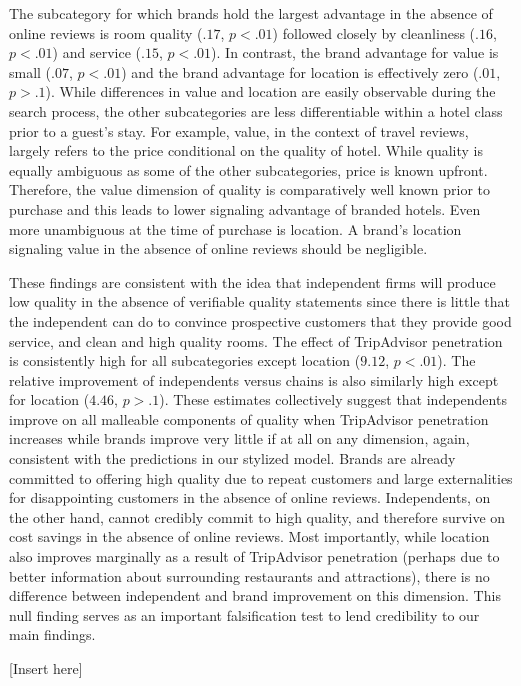 \documentclass[mksc,blindrev]{informs3} %
\begin{document}
The subcategory for which brands hold the largest advantage in the absence of online reviews is room quality ($.17$, $p<.01$) followed closely by cleanliness ($.16$, $p<.01$) and service ($.15$, $p<.01$). In contrast, the brand advantage for value is small ($.07$, $p<.01$) and the brand advantage for location is effectively zero ($.01$, $p>.1$). While differences in value and location are easily observable during the search process, the other subcategories are less differentiable within a hotel class prior to a guest's stay. For example, value, in the context of travel reviews, largely refers to the price conditional on the quality of hotel. While quality is equally ambiguous as some of the other subcategories, price is known upfront. Therefore, the value dimension of quality is comparatively well known prior to purchase and this leads to lower signaling advantage of branded hotels. Even more unambiguous at the time of purchase is location. A brand's location signaling value in the absence of online reviews should be negligible.

These findings are consistent with the idea that independent firms will produce low quality in the absence of verifiable quality statements since there is little that the independent can do to convince prospective customers that they provide good service, and clean and high quality rooms. The effect of TripAdvisor penetration is consistently high for all subcategories except location ($9.12$, $p<.01$). The relative improvement of independents versus chains is also similarly high except for location ($4.46$, $p>.1$). These estimates collectively suggest that independents improve on all malleable components of quality when TripAdvisor penetration increases while brands improve very little if at all on any dimension, again, consistent with the predictions in our stylized model. Brands are already committed to offering high quality due to repeat customers and large externalities for disappointing customers in the absence of online reviews. Independents, on the other hand, cannot credibly commit to high quality, and therefore survive on cost savings in the absence of online reviews. Most importantly, while location also improves marginally as a result of TripAdvisor penetration (perhaps due to better information about surrounding restaurants and attractions), there is no difference between independent and brand improvement on this dimension. This null finding serves as an important falsification test to lend credibility to our main findings.

[Insert  here]
\end{document}
